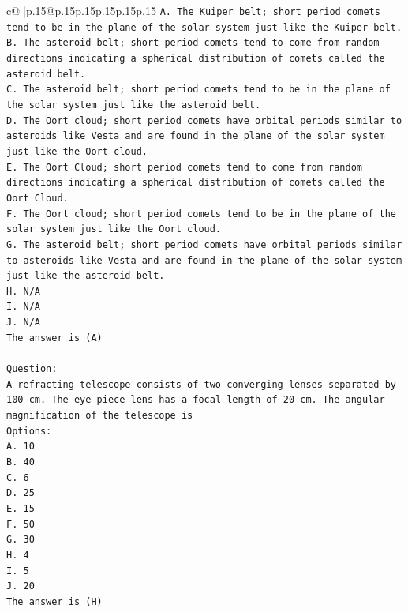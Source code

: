 \documentclass{article}
\begin{document}
{\begin{supertabular}{c@{$\;$}|p{.15\linewidth}@{}p{.15\linewidth}p{.15\linewidth}p{.15\linewidth}p{.15\linewidth}p{.15\linewidth}}
{{{\texttt{A. The Kuiper belt; short period comets tend to be in the plane of the solar system just like the Kuiper belt.} \\
\texttt{B. The asteroid belt; short period comets tend to come from random directions indicating a spherical distribution of comets called the asteroid belt.} \\
\texttt{C. The asteroid belt; short period comets tend to be in the plane of the solar system just like the asteroid belt.} \\
\texttt{D. The Oort cloud; short period comets have orbital periods similar to asteroids like Vesta and are found in the plane of the solar system just like the Oort cloud.} \\
\texttt{E. The Oort Cloud; short period comets tend to come from random directions indicating a spherical distribution of comets called the Oort Cloud.} \\
\texttt{F. The Oort cloud; short period comets tend to be in the plane of the solar system just like the Oort cloud.} \\
\texttt{G. The asteroid belt; short period comets have orbital periods similar to asteroids like Vesta and are found in the plane of the solar system just like the asteroid belt.} \\
\texttt{H. N/A} \\
\texttt{I. N/A} \\
\texttt{J. N/A} \\
\texttt{The answer is (A)} \\
\\ 
\texttt{Question:} \\
\texttt{A refracting telescope consists of two converging lenses separated by 100 cm. The eye{-}piece lens has a focal length of 20 cm. The angular magnification of the telescope is} \\
\texttt{Options:} \\
\texttt{A. 10} \\
\texttt{B. 40} \\
\texttt{C. 6} \\
\texttt{D. 25} \\
\texttt{E. 15} \\
\texttt{F. 50} \\
\texttt{G. 30} \\
\texttt{H. 4} \\
\texttt{I. 5} \\
\texttt{J. 20} \\
\texttt{The answer is (H)} \\
}}}
\end{supertabular}}
\end{document}
